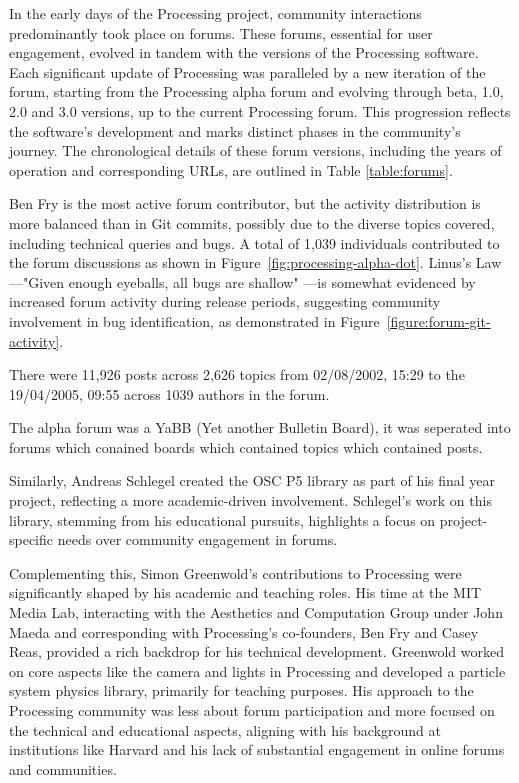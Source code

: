 
In the early days of the Processing project, community interactions predominantly took place on forums. These forums, essential for user engagement, evolved in tandem with the versions of the Processing software. Each significant update of Processing was paralleled by a new iteration of the forum, starting from the Processing alpha forum and evolving through beta, 1.0, 2.0 and 3.0 versions, up to the current Processing forum. This progression reflects the software’s development and marks distinct phases in the community's journey. The chronological details of these forum versions, including the years of operation and corresponding URLs, are outlined in Table \ref{table:forums}. \parencite{ProcessingForum}

Ben Fry is the most active forum contributor, but the activity distribution is more balanced than in Git commits, possibly due to the diverse topics covered, including technical queries and bugs. A total of 1,039 individuals contributed to the forum discussions as shown in Figure~\ref{fig:processing-alpha-dot}.
Linus's Law—"Given enough eyeballs, all bugs are shallow" \parencite[29]{raymondCathedralBazaar1999}—is somewhat evidenced by increased forum activity during release periods, suggesting community involvement in bug identification, as demonstrated in Figure~\ref{figure:forum-git-activity}.



There were 11,926 posts across 2,626 topics from 02/08/2002, 15:29 to the 19/04/2005, 09:55 across 1039 authors in the forum.

The alpha forum was a YaBB (Yet another Bulletin Board), it was seperated into forums which conained boards which contained topics which contained posts.

Similarly, Andreas Schlegel created the OSC P5 library as part of his final year project, reflecting a more academic-driven involvement. Schlegel's work on this library, stemming from his educational pursuits, highlights a focus on project-specific needs over community engagement in forums​​.

Complementing this, Simon Greenwold's contributions to Processing were significantly shaped by his academic and teaching roles. His time at the MIT Media Lab, interacting with the Aesthetics and Computation Group under John Maeda and corresponding with Processing's co-founders, Ben Fry and Casey Reas, provided a rich backdrop for his technical development. Greenwold worked on core aspects like the camera and lights in Processing and developed a particle system physics library, primarily for teaching purposes. His approach to the Processing community was less about forum participation and more focused on the technical and educational aspects, aligning with his background at institutions like Harvard and his lack of substantial engagement in online forums and communities​​​​.

